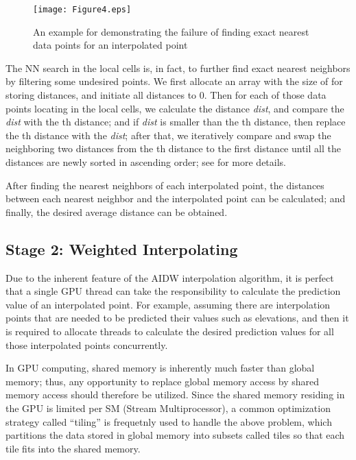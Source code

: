 \documentclass[final,5p,times,twocolumn,authoryear]{elsarticle}
\begin{document}
			\begin{figure}[ht]
				\centering
				\texttt{[image: Figure4.eps]}
				\caption{An example for demonstrating the failure of finding exact 
								nearest data points for an interpolated point}
				\label{fig4}
			\end{figure}
			
			The NN search in the local cells is, in fact, to further find exact nearest 
			neighbors by filtering some undesired points. We first allocate an array 
			with the size of  for storing distances, and initiate all distances to 0. 
			Then for each of those data points locating in the local cells, we calculate 
			the distance \textit{dist}, and compare the \textit{dist} with the th distance; and if \textit{dist} is smaller 
			than the th distance, then replace the th distance with the \textit{dist}; after that, we 
			iteratively compare and swap the neighboring two distances from the th 
			distance to the first distance until all the  distances are newly sorted in 
			ascending order; see \cite{29DBLP:journals/corr/MeiXX15} for more details.
			
			After finding the nearest neighbors of each interpolated point, the 
			distances between each nearest neighbor and the interpolated point can be 
			calculated; and finally, the desired average distance can be obtained. 
			
			\subsection{Stage 2: Weighted Interpolating}
			Due to the inherent feature of the AIDW interpolation algorithm, it is 
			perfect that a single GPU thread can take the responsibility to calculate 
			the prediction value of an interpolated point. For example, assuming there 
			are  interpolation points that are needed to be predicted their values such 
			as elevations, and then it is required to allocate  threads to calculate the 
			desired prediction values for all those  interpolated points concurrently. 
			
			In GPU computing, shared memory is inherently much faster than global 
			memory; thus, any opportunity to replace global memory access by shared 
			memory access should therefore be utilized. Since the shared memory 
			residing in the GPU is limited per SM (Stream Multiprocessor), a common 
			optimization strategy called ``tiling'' is frequetnly used to handle the 
			above problem, which partitions the data stored in global memory into 
			subsets called tiles so that each tile fits into the shared memory.
			
\end{document}
